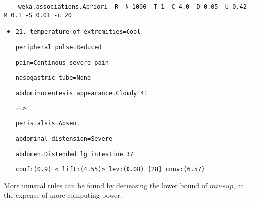 \newpage

\begin{verbatim}
	weka.associations.Apriori -R -N 1000 -T 1 -C 4.0 -D 0.05 -U 0.42 -M 0.1 -S 0.01 -c 20
\end{verbatim}

\begin{itemize}
\item  \verb|21. temperature of extremities=Cool|

\verb|peripheral pulse=Reduced |

\verb|pain=Continous severe pain|

\verb|nasogastric tube=None |

\verb|abdominocentesis appearance=Cloudy 41 |

\verb|==> |

\verb|peristalsis=Absent |

\verb|abdominal distension=Severe |

\verb|abdomen=Distended lg intestine 37    |

\verb|conf:(0.9) < lift:(4.55)> lev:(0.08) [28] conv:(6.57)|
\end{itemize}


\noindent
More unusual rules can be found by decreasing the lower bound of $minsup$, at the expense of more computing power.